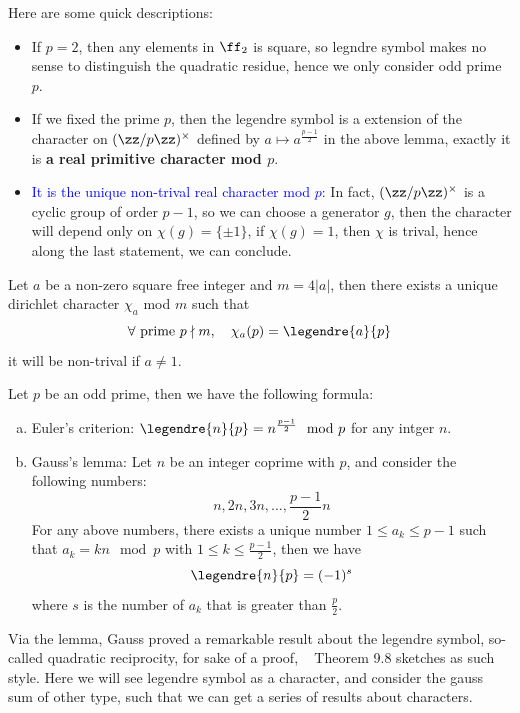 Here are some quick descriptions:

\begin{itemize}
    \item If \(p = 2\), then any elements in \(\ff_2\) is square, so legndre symbol makes no sense to distinguish the quadratic residue, hence we only consider odd prime \(p\).

    \item If we fixed the prime \(p\), then the legendre symbol is a extension of the character on \((\zz/p\zz)^\times\) defined by \(a \mapsto a^{\frac{p-1}{2}}\) in the above lemma, exactly it is \textbf{a real primitive character mod \(p\)}.
    
    \item \textcolor{blue}{It is the unique non-trival real character mod \(p\):} In fact, \((\zz/p\zz)^\times\) is a cyclic group of order \(p-1\), so we can choose a generator \(g\), then the character will depend only on \(\chi(g) = \{\pm 1\}\), if \(\chi(g) = 1\), then \(\chi\) is trival, hence along the last statement, we can conclude.
\end{itemize} 

\begin{proposition}
    Let \(a\) be a non-zero square free integer and \(m = 4|a|\), then there exists a unique dirichlet character \(\chi_a\) mod \(m\) such that 
    \[\forall \text{ prime } p \nmid m, \quad \chi_a(p) = \legendre{a}{p}\]
    it will be non-trival if \(a \neq 1\).
\end{proposition}

\begin{proposition}
Let \(p\) be an odd prime, then we have the following formula:
\begin{enumerate}[(a)]
    \item Euler's criterion: \(\legendre{n}{p} = n^{\frac{p-1}{2}} \mod p\) for any intger \(n\).
    \item Gauss's lemma: Let \(n\) be an integer coprime with \(p\), and consider the following numbers:
    \[n,2n,3n,\dots, \frac{p-1}{2}n\]
    For any above numbers, there exists a unique number \(1 \leq a_k \leq p-1\) such that \(a_k = kn \mod p\) with \(1 \leq k \leq \frac{p-1}{2}\), then we have
    \[\legendre{n}{p} = (-1)^s\]
    where \(s\) is the number of \(a_k\) that is greater than \(\frac{p}{2}\).
\end{enumerate}

\end{proposition}


Via the lemma, Gauss proved a remarkable result about the legendre symbol, so-called quadratic reciprocity, for sake of a proof, ~\cite{Apostol} Theorem 9.8 sketches as such style. Here we will see legendre symbol as a character, and consider the gauss sum of other type, such that we can get a series of results about characters.

